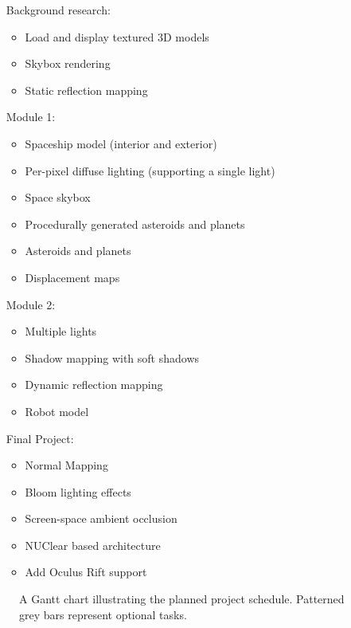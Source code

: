 \documentclass[11pt]{scrartcl} %
\begin{document}
\begin{itemize}
    \item[Background research:]
        \begin{itemize}
            \item[]
            \item Load and display textured 3D models
            \item Skybox rendering
            \item Static reflection mapping
        \end{itemize}
    \item[Module 1:]
        \begin{itemize}
            \item[]
            \item Spaceship model (interior and exterior)
            \item Per-pixel diffuse lighting (supporting a single light)
            \item Space skybox
            \item Procedurally generated asteroids and planets
            \item Asteroids and planets
            \item Displacement maps
        \end{itemize}
    \item[Module 2:]
        \begin{itemize}
            \item[]
            \item Multiple lights
            \item Shadow mapping with soft shadows
            \item Dynamic reflection mapping
            \item Robot model
        \end{itemize}
    \item[Final Project:]
        \begin{itemize}
            \item[]
            \item Normal Mapping
            \item Bloom lighting effects
            \item Screen-space ambient occlusion
            \item NUClear based architecture
            \item Add Oculus Rift support
        \end{itemize}
    \end{itemize}

    \begin{figure}[H]
        \makebox[\textwidth][c]{\resizebox{0.95\paperwidth}{!}{}}
        \caption[Project Schedule]{
            A Gantt chart illustrating the planned project schedule.
            Patterned grey bars represent optional tasks.
        }
        \label{gantt:schedule}
    \end{figure}
\end{document}

